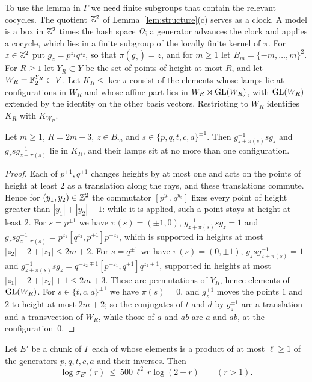 To use the lemma in $\Gamma$ we need finite subgroups that contain the relevant cocycles. The quotient $\mathbb Z^2$ of Lemma~\ref{lem:structure}(c)
serves as a clock. A model is a box in $\mathbb Z^2$ times the hash space $\Omega$; a generator advances the clock and applies a cocycle, which lies in
a finite subgroup of the locally finite kernel of $\pi$. For $z\in\mathbb Z^2$ put $g_z=p^{z_1}q^{z_2}$, so that
$\pi(g_z)=z$, and for $m\ge1$ let $B_m=\{-m,\dots,m\}^2$. For $R\ge1$ let $Y_R\subset Y$ be the set of points of height at most $R$, and let
$W_R=\mathbb F_2^{Y_R}\subset V$. Let $K_R\le\ker\pi$ consist of the elements whose lamps lie at configurations in $W_R$ and whose affine part lies in
$W_R\rtimes\operatorname{GL}(W_R)$, with $\operatorname{GL}(W_R)$ extended by the identity on the other basis vectors. Restricting to $W_R$ identifies $K_R$ with $K_{W_R}$.

\begin{lemma}\label{lem:clock}
Let $m\ge1$, $R=2m+3$, $z\in B_m$ and $s\in\{p,q,t,c,a\}^{\pm1}$. Then $g_{z+\pi(s)}^{-1}sg_z$ and $g_zsg_{z+\pi(s)}^{-1}$ lie in $K_R$, and their
lamps sit at no more than one configuration.
\end{lemma}

\begin{proof}
Each of $p^{\pm1},q^{\pm1}$ changes heights by at most one and acts on the points of height at least $2$ as a translation along the rays, and these
translations commute. Hence for $(y_1,y_2)\in\mathbb Z^2$ the commutator $[p^{y_1},q^{y_2}]$ fixes every point of height greater than $|y_1|+|y_2|+1$:
while it is applied, such a point stays at height at least $2$. For $s=p^{\pm1}$ we have $\pi(s)=(\pm1,0)$, $g_{z+\pi(s)}^{-1}sg_z=1$ and
$g_zsg_{z+\pi(s)}^{-1}=p^{z_1}[q^{z_2},p^{\pm1}]p^{-z_1}$, which is supported in heights at most $|z_2|+2+|z_1|\le2m+2$. For $s=q^{\pm1}$ we have
$\pi(s)=(0,\pm1)$, $g_zsg_{z+\pi(s)}^{-1}=1$ and $g_{z+\pi(s)}^{-1}sg_z=q^{-z_2\mp1}[p^{-z_1},q^{\pm1}]q^{z_2\pm1}$, supported in heights at most
$|z_1|+2+|z_2|+1\le2m+3$. These are permutations of
$Y_R$, hence elements of $\operatorname{GL}(W_R)$. For $s\in\{t,c,a\}^{\pm1}$ we have $\pi(s)=0$, and $g_z^{\pm1}$ moves the points $1$ and $2$ to height at most
$2m+2$; so the conjugates of $t$ and $d$ by $g_z^{\pm1}$ are a translation and a transvection of $W_R$, while those of $a$ and $ab$ are $a$ and
$ab$, at the configuration~$0$.
\end{proof}

\begin{proposition}\label{prop:upper}
Let $E'$ be a chunk of $\Gamma$ each of whose elements is a product of at most $\ell\ge1$ of the generators $p,q,t,c,a$ and their inverses. Then
\[
\log\sigma_{E'}(r)\ \le\ 500\,\ell^2\,r\log(2+r)\qquad(r>1).
\]
\end{proposition}

